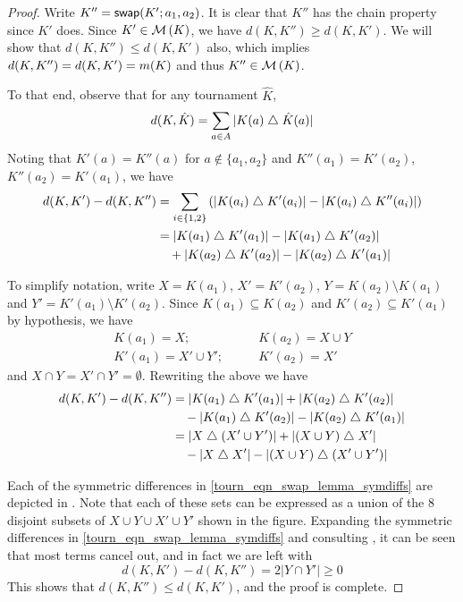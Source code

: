 \begin{proof}
    Write $K'' = \mathsf{swap}({K'}; {a_1}, {a_2})$. It is clear that $K''$ has the chain
    property since $K'$ does. Since $K' \in \operatorname{\mathcal{M}}\left({K}\right)$, we have $d(K, K'') \ge
    d(K, K')$. We will show that $d(K, K'') \le d(K, K')$ also, which implies
    $d(K, K'') = d(K, K') = m({K})$ and thus $K'' \in \operatorname{\mathcal{M}}\left({K}\right)$.

    To that end, observe that for any tournament $\hat{K}$,
    \[
        d(K, \hat{K}) = \sum_{a \in A}{|K(a) \mathrel{\triangle} \hat{K}(a)|}
    \]
    Noting that $K'(a) = K''(a)$ for $a \notin \{a_1,a_2\}$ and $K''(a_1) =
    K'(a_2)$, $K''(a_2) = K'(a_1)$, we have
    \begin{align*}
        d(K, K') - d(K, K'')
        &= \sum_{i \in \{1,2\}}{\left(
            |K(a_i) \mathrel{\triangle} K'(a_i)| - |K(a_i) \mathrel{\triangle} K''(a_i)|
        \right)} \\
        &= |K(a_1) \mathrel{\triangle} K'(a_1)| - |K(a_1) \mathrel{\triangle} K'(a_2)| \\
        &\quad + |K(a_2) \mathrel{\triangle} K'(a_2)| - |K(a_2) \mathrel{\triangle} K'(a_1)|
    \end{align*}

    To simplify notation, write $X = K(a_1)$, $X' = K'(a_2)$, $Y = K(a_2)
    \setminus K(a_1)$ and $Y' = K'(a_1) \setminus K'(a_2)$. Since $K(a_1)
    \subseteq K(a_2)$ and $K'(a_2) \subseteq K'(a_1)$ by hypothesis, we have
    \begin{align*}
        K(a_1) = X;
            &\quad\quad
        K(a_2) = X \cup Y \\
        K'(a_1) = X' \cup Y';
            &\quad\quad
        K'(a_2) = X'
    \end{align*}
    and $X \cap Y = X' \cap Y' = \emptyset$. Rewriting the above we have
    \begin{align}
        d(K, K') - d(K, K'')
        &= |K(a_1) \mathrel{\triangle} K'(a_1)|
           + |K(a_2) \mathrel{\triangle} K'(a_2)|
            \nonumber \\
        &  \quad
           - |K(a_1) \mathrel{\triangle} K'(a_2)|
           - |K(a_2) \mathrel{\triangle} K'(a_1)| \nonumber \\
        &= |X \mathrel{\triangle} (X' \cup Y')|
           + |(X \cup Y) \mathrel{\triangle} X'| \nonumber \\
        &  \quad
           -
           |X \mathrel{\triangle} X'|
           - |(X \cup Y) \mathrel{\triangle} (X' \cup Y')|
           \label{tourn_eqn_swap_lemma_symdiffs}
    \end{align}

    Each of the symmetric differences in \cref{tourn_eqn_swap_lemma_symdiffs} are
    depicted in . Note that each of these sets can
    be expressed as a union of the 8 disjoint subsets of $X \cup Y \cup X' \cup
    Y'$ shown in the figure. Expanding the symmetric differences in
    \cref{tourn_eqn_swap_lemma_symdiffs} and consulting ,
    it can be seen that most terms cancel out, and in fact we are left with
    \[
        d(K, K') - d(K, K'') = 2|Y \cap Y'|  \ge 0
    \]
    This shows that $d(K, K'') \le d(K, K')$, and the proof is complete.
\end{proof}

